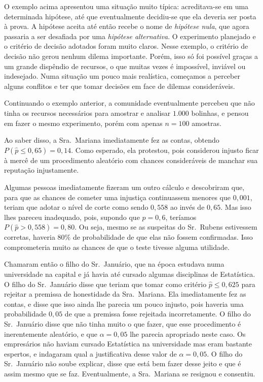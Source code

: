 \documentclass[12pt,a4paper]{article}
\theoremstyle{plain}
\theoremstyle{definition}
\theoremstyle{remark}
\newenvironment{example}{\pushQED{\qed}\renewcommand{\qedsymbol}{\scriptsize$\triangle$}\examplex}{\popQED\endexamplex}
\begin{document}
O exemplo acima apresentou uma situação muito típica: acreditava-se em uma determinada hipótese, até que eventualmente decidiu-se que ela deveria ser posta à prova.
A hipótese aceita até então recebe o nome de \emph{hipótese nula}, que agora passaria a ser desafiada por uma \emph{hipótese alternativa}.
O experimento planejado e o critério de decisão adotados foram muito claros.
Nesse exemplo, o critério de decisão não gerou nenhum dilema importante.
Porém, isso só foi possível graças a um grande dispêndio de recursos, o que muitas vezes é impossível, inviável ou indesejado.
Numa situação um pouco mais realística, começamos a perceber alguns conflitos e ter que tomar decisões em face de dilemas consideráveis.

\begin{example}
\label{exp:dificil}
Continuando o exemplo anterior, a comunidade eventualmente percebeu que não tinha os recursos necessários para amostrar e analisar $1.000$ bolinhas, e pensou em fazer o mesmo experimento, porém com apenas $n=100$ amostras.

Ao saber disso, a Sra.~Mariana imediatamente fez as contas, obtendo $P(\hat{p} \leq 0,65) = 0,14$. Como esperado, ela protestou, pois considerou injusto ficar à mercê de um procedimento aleatório com chances consideráveis de manchar sua reputação injustamente.

Algumas pessoas imediatamente fizeram um outro cálculo e descobriram que, para que as chances de cometer uma injustiça continuassem menores que $0,001$, teriam que adotar o nível de corte como sendo $0,558$ ao invés de $0,65$.
Mas isso lhes pareceu inadequado, pois, supondo que $p=0,6$, teríamos $P(\hat{p} > 0,558) = 0,80$.
Ou seja, mesmo se as suspeitas do Sr.~Rubens estivessem corretas, haveria $80\%$ de probabilidade de que elas não fossem confirmadas.
Isso comprometeria muito as chances de que o teste tivesse alguma utilidade.

Chamaram então o filho do Sr.~Januário, que na época estudava numa universidade na capital e já havia até cursado algumas disciplinas de Estatística.
O filho do Sr.~Januário disse que teriam que tomar como critério $\hat{p} \leq 0,625$ para rejeitar a premissa de honestidade da Sra.~Mariana.
Ela imediatamente fez as contas, e disse que isso ainda lhe parecia um pouco injusto, pois haveria uma probabilidade $0,05$ de que a premissa fosse rejeitada incorretamente.
O filho do Sr.~Januário disse que não tinha muito o que fazer, que esse procedimento é inerentemente aleatório, e que $\alpha=0,05$ lhe parecia apropriado neste caso.
Os empresários não haviam cursado Estatística na universidade mas eram bastante espertos, e indagaram qual a justificativa desse valor de $\alpha=0,05$.
O filho do Sr.~Januário não soube explicar, disse que está bem fazer desse jeito e que é assim mesmo que se faz.
Eventualmente, a Sra.~Mariana se resignou e consentiu.


\end{example}
\end{document}
